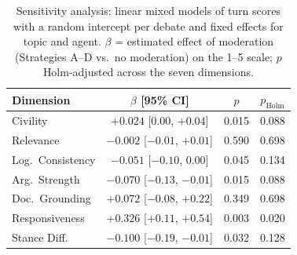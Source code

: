 \begin{table}[htbp]
\centering
\caption[Mixed-model sensitivity analysis]{Sensitivity analysis: linear mixed models of turn scores with a random intercept per debate and fixed effects for topic and agent. $\beta$ = estimated effect of moderation (Strategies A--D vs.\ no moderation) on the 1--5 scale; $p$ Holm-adjusted across the seven dimensions.}
\label{tab:mixed}
\small
\begin{tabular}{l c c c}
\toprule
\textbf{Dimension} & $\beta$ [95\% CI] & $p$ & $p_{\text{Holm}}$ \\
\midrule
Civility & $+0.024$ [$0.00$, $+0.04$] & 0.015 & 0.088 \\
Relevance & $-0.002$ [$-0.01$, $+0.01$] & 0.590 & 0.698 \\
Log.\ Consistency & $-0.051$ [$-0.10$, $0.00$] & 0.045 & 0.134 \\
Arg.\ Strength & $-0.070$ [$-0.13$, $-0.01$] & 0.015 & 0.088 \\
Doc.\ Grounding & $+0.072$ [$-0.08$, $+0.22$] & 0.349 & 0.698 \\
Responsiveness & $+0.326$ [$+0.11$, $+0.54$] & 0.003 & 0.020 \\
Stance Diff. & $-0.100$ [$-0.19$, $-0.01$] & 0.032 & 0.128 \\
\bottomrule
\end{tabular}
\end{table}